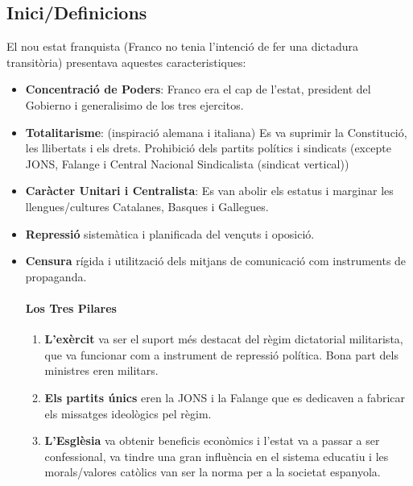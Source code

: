 \documentclass[arial,a4paper,print]{article}
\begin{document}
\subsection{Inici/Definicions}
El nou estat franquista (Franco no tenia l'intenció de fer una dictadura transitòria) presentava aquestes caracteristiques:
\begin{itemize}
\item \textbf{Concentració de Poders}: Franco era el cap de l'estat, president del Gobierno i generalisimo de los tres ejercitos. 

\item \textbf{Totalitarisme}: (inspiració alemana i italiana) Es va suprimir la Constitució, les llibertats i els drets. Prohibició dels partits polítics i sindicats (excepte JONS, Falange i Central Nacional Sindicalista (sindicat vertical))

\item \textbf{Caràcter Unitari i Centralista}: Es van abolir els estatus i marginar les llengues/cultures Catalanes, Basques i Gallegues. 

\item \textbf{Repressió} sistemàtica i planificada del vençuts i oposició.

\item \textbf{Censura} rígida i utilització dels mitjans de comunicació com instruments de propaganda. 

\paragraph{Los Tres Pilares}
\begin{enumerate}
	\item \textbf{L'exèrcit} va ser el suport més destacat del règim dictatorial militarista, que va funcionar com a instrument de repressió política. Bona part dels ministres eren militars.
	
	\item \textbf{Els partits únics} eren la JONS i la Falange que es dedicaven a fabricar els missatges ideològics pel règim. 
	
	\item \textbf{L'Esglèsia} va obtenir beneficis econòmics i l'estat va a passar a ser confessional, va tindre una gran influència en el sistema educatiu i les morals/valores catòlics van ser la norma per a la societat espanyola.  
\end{enumerate}
\end{itemize}
\end{document}
